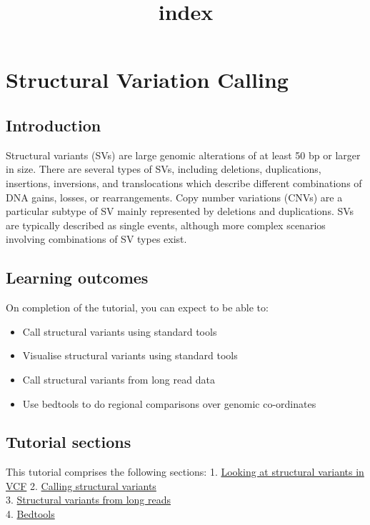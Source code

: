 \documentclass[11pt]{article}
\title{index}
\providecommand{\tightlist}{%
      \setlength{\itemsep}{0pt}\setlength{\parskip}{0pt}}
\begin{document}
    \hypertarget{structural-variation-calling}{%
\section{Structural Variation
Calling}\label{structural-variation-calling}}

\hypertarget{introduction}{%
\subsection{Introduction}\label{introduction}}

Structural variants (SVs) are large genomic alterations of at least 50
bp or larger in size. There are several types of SVs, including
deletions, duplications, insertions, inversions, and translocations
which describe different combinations of DNA gains, losses, or
rearrangements. Copy number variations (CNVs) are a particular subtype
of SV mainly represented by deletions and duplications. SVs are
typically described as single events, although more complex scenarios
involving combinations of SV types exist.

    \hypertarget{learning-outcomes}{%
\subsection{Learning outcomes}\label{learning-outcomes}}

On completion of the tutorial, you can expect to be able to:

\begin{itemize}
\tightlist
\item
  Call structural variants using standard tools
\item
  Visualise structural variants using standard tools
\item
  Call structural variants from long read data
\item
  Use bedtools to do regional comparisons over genomic co-ordinates
\end{itemize}

\hypertarget{tutorial-sections}{%
\subsection{Tutorial sections}\label{tutorial-sections}}

This tutorial comprises the following sections: 1.
\href{vcfs.ipynb}{Looking at structural variants in VCF} 2.
\href{sv-calling.ipynb}{Calling structural variants}\\
3. \href{long-reads.ipynb}{Structural variants from long reads}\\
4. \href{bedtools.ipynb}{Bedtools}
\end{document}

